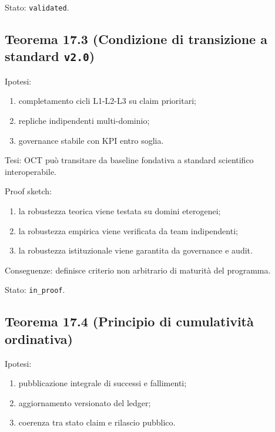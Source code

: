 Stato: \texttt{validated}.

\subsection{\texorpdfstring{Teorema 17.3 (Condizione di transizione a standard \texttt{v2.0})}{Teorema 17.3 (Condizione di transizione a standard v2.0)}}

Ipotesi:

\begin{enumerate}
\def\labelenumi{\arabic{enumi}.}
\tightlist
\item
  completamento cicli L1-L2-L3 su claim prioritari;
\item
  repliche indipendenti multi-dominio;
\item
  governance stabile con KPI entro soglia.
\end{enumerate}

Tesi:
OCT può transitare da baseline fondativa a standard scientifico interoperabile.

Proof sketch:

\begin{enumerate}
\def\labelenumi{\arabic{enumi}.}
\tightlist
\item
  la robustezza teorica viene testata su domini eterogenei;
\item
  la robustezza empirica viene verificata da team indipendenti;
\item
  la robustezza istituzionale viene garantita da governance e audit.
\end{enumerate}

Conseguenze:
definisce criterio non arbitrario di maturità del programma.

Stato: \texttt{in\_proof}.

\subsection{Teorema 17.4 (Principio di cumulatività ordinativa)}

Ipotesi:

\begin{enumerate}
\def\labelenumi{\arabic{enumi}.}
\tightlist
\item
  pubblicazione integrale di successi e fallimenti;
\item
  aggiornamento versionato del ledger;
\item
  coerenza tra stato claim e rilascio pubblico.
\end{enumerate}

